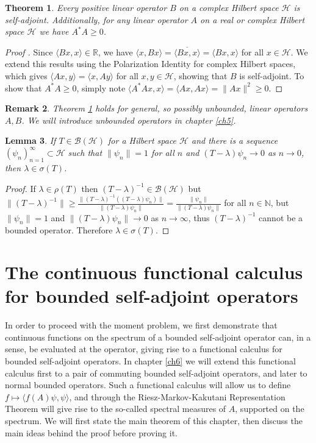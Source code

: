 \documentclass[12pt,oneside]{report}
\newtheorem{thm}{Theorem}[chapter]
\newtheorem{lem}[thm]{Lemma}
\newtheorem{rem}[thm]{Remark}
\begin{document}
\begin{thm}\label{pos-selfadj}
    Every positive linear operator $B$ on a complex Hilbert space $\mathscr{H}$ is self-adjoint. Additionally, for any linear operator $A$ on a real or complex Hilbert space $\mathscr{H}$ we have $A^{*}A \geq 0$.
\end{thm}
\begin{proof}[Proof \cite{Reed_Simon_1980}]
    Since $\langle Bx, x \rangle \in \mathbb{R}$, we have $\langle x, Bx \rangle = \overline{\langle Bx, x \rangle} = \langle Bx, x \rangle$ for all $x \in \mathscr{H}$. We extend this results using the Polarization Identity for complex Hilbert spaces, which gives $\langle Ax, y \rangle = \langle x, Ay \rangle$ for all $x,y \in \mathscr{H}$, showing that $B$ is self-adjoint. To show that $A^{*}A \geq 0$, simply note $\langle A^{*}Ax,x \rangle = \langle Ax, Ax \rangle = \|Ax\|^{2} \geq 0$.
\end{proof}

\begin{rem}
    Theorem \ref{pos-selfadj} holds for general, so possibly unbounded, linear operators $A,B$. We will introduce unbounded operators in chapter \ref{ch5}.
\end{rem}

\begin{lem}\label{spectr-condition}
    If $T \in \mathscr{B}(\mathscr{H})$ for a Hilbert space $\mathscr{H}$ and there is a sequence $(\psi_{n})_{n=1}^{\infty} \subset \mathscr{H}$ such that $\|\psi_{n}\| = 1$ for all $n$ and $(T-\lambda)\psi_{n} \to 0$ as $n \to 0$, then $\lambda \in \sigma(T)$.
\end{lem}
\begin{proof}
    If $\lambda \in \rho(T)$ then $(T - \lambda)^{-1} \in \mathscr{B}(\mathscr{H})$ but $\|(T - \lambda)^{-1}\| \geq \frac{\|(T - \lambda)^{-1}((T - \lambda)\psi_{n})\|}{\|(T-\lambda)\psi_{n}\|} = \frac{\|\psi_{n}\|}{\|(T-\lambda)\psi_{n}\|}$ for all $n \in \mathbb{N}$, but $\|\psi_{n}\| = 1$ and $\|(T-\lambda)\psi_{n}\| \to 0$ as $n \to \infty$, thus $(T-\lambda)^{-1}$ cannot be a bounded operator. Therefore $\lambda \in \sigma(T)$.
\end{proof}

\chapter{The continuous functional calculus for bounded self-adjoint operators}\label{ch3}

In order to proceed with the moment problem, we first demonstrate that continuous functions on the spectrum of a bounded self-adjoint operator can, in a sense, be evaluated at the operator, giving rise to a functional calculus for bounded self-adjoint operators. In chapter  \ref{ch6} we will extend this functional calculus first to a pair of commuting bounded self-adjoint operators, and later to normal bounded operators. Such a functional calculus will allow us to define $f \mapsto \langle f(A) \psi, \psi \rangle$, and through the Riesz-Markov-Kakutani Representation Theorem will give rise to the so-called spectral measures of $A$, supported on the spectrum. We will first state the main theorem of this chapter, then discuss the main ideas behind the proof before proving it.
\end{document}
